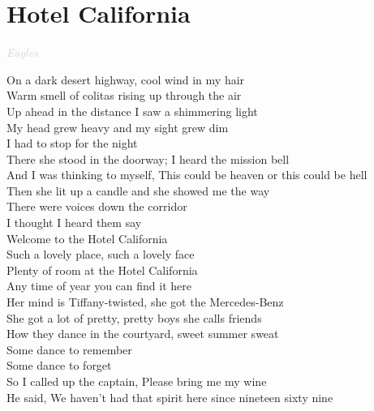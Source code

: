 \documentclass[a5paper, 10pt]{book}
\begin{document}
\newpage
\section{Hotel California}\textcolor{lightgray}{\textit{Eagles}}\vspace*{2mm}\\
\begin{minipage}[t]{0.9\textwidth}
  On a dark desert highway, cool wind in my hair\\
  Warm smell of colitas rising up through the air\\
  Up ahead in the distance I saw a shimmering light\\
  My head grew heavy and my sight grew dim\\
  I had to stop for the night\vspace*{2mm}\\
  There she stood in the doorway; I heard the mission bell\\
  And I was thinking to myself, This could be heaven or this could be hell\\
  Then she lit up a candle and she showed me the way\\
  There were voices down the corridor\\
  I thought I heard them say\vspace*{2mm}\\
  \hspace*{5mm}Welcome to the Hotel California\\
  \hspace*{5mm}Such a lovely place, such a lovely face\\
  \hspace*{5mm}Plenty of room at the Hotel California\\
  \hspace*{5mm}Any time of year you can find it here\vspace*{2mm}\\
  Her mind is Tiffany-twisted, she got the Mercedes-Benz\\
  She got a lot of pretty, pretty boys she calls friends\\
  How they dance in the courtyard, sweet summer sweat\\
  Some dance to remember\\
  Some dance to forget\vspace*{2mm}\\
  So I called up the captain, Please bring me my wine\\
  He said, We haven't had that spirit here since nineteen sixty nine\\

\end{minipage}
\end{document}

